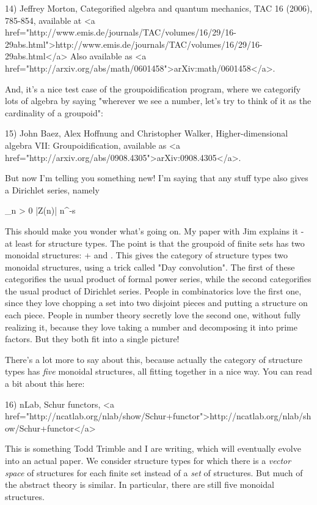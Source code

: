 14) Jeffrey Morton, Categorified algebra and quantum mechanics, TAC 16
(2006), 785-854, available at <a
href="http://www.emis.de/journals/TAC/volumes/16/29/16-29abs.html">http://www.emis.de/journals/TAC/volumes/16/29/16-29abs.html</a>
Also available as <a
href="http://arxiv.org/abs/math/0601458">arXiv:math/0601458</a>.

And, it's a nice test case of the groupoidification program, where we
categorify lots of algebra by saying "wherever we see a number, let's
try to think of it as the cardinality of a groupoid":

15) John Baez, Alex Hoffnung and Christopher Walker,
Higher-dimensional algebra VII: Groupoidification, available as <a
href="http://arxiv.org/abs/0908.4305">arXiv:0908.4305</a>.

But now I'm telling you something new!  I'm saying that any stuff type
also gives a Dirichlet series, namely

\sum_{n > 0} |Z(n)| n^{-s}

This should make you wonder what's going on.  My paper with Jim
explains it - at least for structure types.  The point is that the
groupoid of finite sets has two monoidal structures: + and \times .
This gives the category of structure types two monoidal structures,
using a trick called "Day convolution".  The first of these
categorifies the usual product of formal power series, while the
second categorifies the usual product of Dirichlet series.  People in
combinatorics love the first one, since they love chopping a set into
two disjoint pieces and putting a structure on each piece.  People in
number theory secretly love the second one, without fully realizing
it, because they love taking a number and decomposing it into prime
factors.  But they both fit into a single picture!

There's a lot more to say about this, because actually the category of
structure types has \emph{five} monoidal structures, all fitting
together in a nice way.  You can read a bit about this here:

16) nLab, Schur functors, <a href="http://ncatlab.org/nlab/show/Schur+functor">http://ncatlab.org/nlab/show/Schur+functor</a>

This is something Todd Trimble and I are writing, which will
eventually evolve into an actual paper.  We consider structure types
for which there is a \emph{vector space} of structures for each finite
set instead of a \emph{set} of structures.  But much of the abstract
theory is similar.  In particular, there are still five monoidal
structures.

